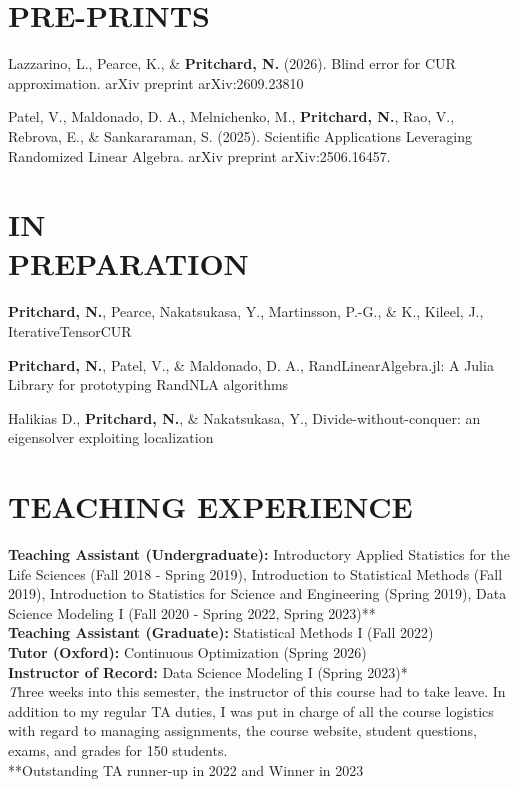 \documentclass[margin,11pt]{res}
\def\nwp{\textbf{Pritchard, N.}}
\begin{document}
\begin{resume}
\section{PRE-PRINTS}
Lazzarino, L., Pearce, K., \& \nwp{} (2026). Blind error for CUR approximation. arXiv preprint  arXiv:2609.23810

Patel, V., Maldonado, D. A., Melnichenko, M., \nwp, Rao, V., Rebrova, E., \& Sankararaman, S. (2025). Scientific Applications Leveraging Randomized Linear Algebra. arXiv preprint arXiv:2506.16457.

\section{IN \\PREPARATION}

\nwp, Pearce,  Nakatsukasa, Y., Martinsson, P.-G., \& K., Kileel, J.,  IterativeTensorCUR

\nwp, Patel, V., \& Maldonado, D. A., RandLinearAlgebra.jl: A Julia Library for prototyping RandNLA algorithms

Halikias D., \nwp, \& Nakatsukasa, Y., Divide-without-conquer: an eigensolver exploiting localization 

\section{TEACHING EXPERIENCE}
{\bf  Teaching Assistant (Undergraduate):} Introductory Applied Statistics for the Life Sciences (Fall 2018 - Spring 2019), Introduction to Statistical Methods (Fall 2019), Introduction to Statistics for Science and Engineering (Spring 2019), Data Science Modeling I (Fall 2020 - Spring 2022, Spring 2023)**\\
{\bf Teaching Assistant (Graduate):} Statistical Methods I (Fall 2022)\\
{\bf Tutor (Oxford):} Continuous Optimization (Spring 2026)\\ 
{\bf Instructor of Record:} Data Science Modeling I (Spring 2023)* \hfill\\
 { \textit*Three weeks into this semester, the instructor of this course had to take leave. In addition to my regular TA duties, I was put in charge of all the course logistics with regard to managing assignments,  the course website, student questions,  exams, and grades for 150 students.\\
{**Outstanding TA runner-up in 2022 and Winner in 2023}\\
}

\end{resume}
\end{document}
